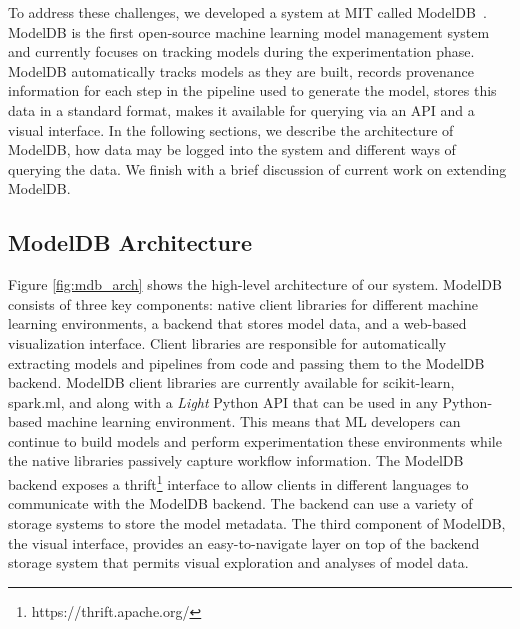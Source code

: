 \documentclass[11pt]{article}
\newcommand{\mpv}[1]{\textcolor{blue}{mpv: #1}}
\newcommand{\mdb}{{\sc ModelDB}\xspace}
\newcommand{\mlwf}{ML workflow\xspace}
\newcommand{\wf}{workflow\xspace}
\newcommand{\mldevs}{ML developers\xspace}
\begin{document}
To address these challenges, we developed a system at MIT called \mdb~\cite{modeldb-hilda}. 
\mdb is the first open-source machine learning model management system and currently focuses on tracking models during the experimentation phase.
\mdb automatically tracks models as they are built, records 
provenance information for each step in the pipeline used to generate the model, stores this 
data in a standard format, makes it available for querying via an API and
a visual interface.
In the following sections, we describe the architecture of \mdb, how data may be logged into the system and different ways of querying the data.
We finish with a brief discussion of current work on extending \mdb.



\subsection{\mdb Architecture}

Figure \ref{fig:mdb_arch} shows the high-level architecture of our system. 
\mdb consists of three key components: native client libraries for different machine learning environments, a backend that stores
model data, and a web-based visualization interface. 
Client libraries are responsible for automatically extracting models and pipelines from code
and passing them to the \mdb backend. 
\mdb client libraries are currently available for scikit-learn, spark.ml, and along with a {\it Light} Python API that can be used in any Python-based machine learning environment.
This means that \mldevs can continue to build models and perform 
experimentation these environments while the native libraries
passively capture \wf information.
The \mdb backend exposes a thrift\footnote{https://thrift.apache.org/} 
interface to allow clients in different 
languages to communicate with the \mdb backend. 
The backend can use a variety of storage systems to store the model metadata.
The third component of \mdb, the visual interface, provides an easy-to-navigate layer on top of the backend storage system that permits visual exploration and analyses of model data.
\end{document}
